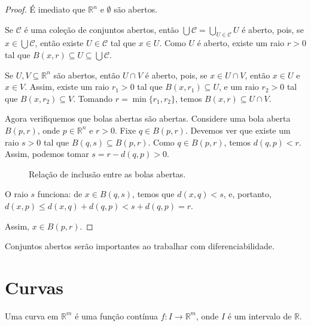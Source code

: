 \begin{proof}
    É imediato que $\mathbb R^n$ e $\emptyset$ são abertos.

    Se $\mathcal C$ é uma coleção de conjuntos abertos, então $\bigcup \mathcal C=\bigcup_{U \in \mathcal C} U$ é aberto, pois, se $x \in \bigcup \mathcal C$, então existe $U \in \mathcal C$ tal que $x \in U$.
    Como $U$ é aberto, existe um raio $r > 0$ tal que $B(x, r) \subseteq U \subseteq \bigcup \mathcal C$.

    Se $U, V\subseteq \mathbb R^n$ são abertos, então $U\cap V$ é aberto, pois, se $x \in U\cap V$, então $x \in U$ e $x \in V$. Assim, existe um raio $r_1 > 0$ tal que $B(x, r_1) \subseteq U$, e um raio $r_2 > 0$ tal que $B(x, r_2) \subseteq V$. Tomando $r = \min\{r_1, r_2\}$, temos $B(x, r) \subseteq U\cap V$.

    Agora verifiquemos que bolas abertas são abertas.
    Considere uma bola aberta $B(p, r)$, onde $p \in \mathbb R^n$ e $r > 0$.
    Fixe $q \in B(p, r)$.
    Devemos ver que existe um raio $s > 0$ tal que $B(q, s) \subseteq B(p, r)$.
    Como $q \in B(p, r)$, temos $d(q, p) < r$.
    Assim, podemos tomar $s = r - d(q, p) > 0$.
    \begin{figure}
    \centering
    \caption{Relação de inclusão entre as bolas abertas.}
    \end{figure}
    O raio $s$ funciona: de $x \in B(q, s)$, temos que $d(x, q) < s$, e, portanto, $d(x, p)\leq d(x, q) + d(q, p) < s + d(q, p) =r$.

    Assim, $x \in B(p, r)$.
\end{proof}

Conjuntos abertos serão importantes ao trabalhar com diferenciabilidade.
\section{Curvas}
\begin{definition}
Uma curva em $\mathbb R^m$ é uma função contínua $f: I\rightarrow \mathbb R^m$, onde $I$ é um intervalo de $\mathbb R$.
\end{definition}

